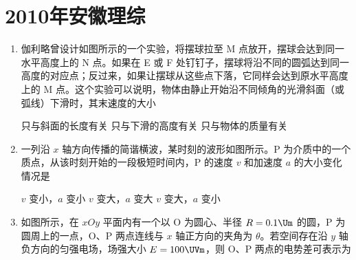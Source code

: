 \documentclass[\gkver]{gaokaozhenti}
\begin{document}
\chapter{2010年安徽理综}

\begin{enumerate}
\item
伽利略曾设计如图所示的一个实验，将摆球拉至 M 点放开，摆球会达到同一水平高度上的 N 点。如果在 E 或 F 处钉钉子，摆球将沿不同的圆弧达到同一高度的对应点；反过来，如果让摆球从这些点下落，它同样会达到原水平高度上的 M 点。这个实验可以说明，物体由静止开始沿不同倾角的光滑斜面（或弧线）下滑时，其末速度的大小


{只与斜面的长度有关}
{只与下滑的高度有关}
{只与物体的质量有关}


\item
一列沿 $x$ 轴方向传播的简谐横波，某时刻的波形如图所示。P 为介质中的一个质点，从该时刻开始的一段极短时间内，P 的速度 $v$ 和加速度 $a$ 的大小变化情况是


{$v$ 变小，$a$ 变小}
{$v$ 变大，$a$ 变大}
{$v$ 变大，$a$ 变小}


\item
如图所示，在 $xOy$ 平面内有一个以 O 为圆心、半径 $R=0.1\Um$ 的圆，P 为圆周上的一点，O、P 两点连线与 $x$ 轴正方向的夹角为 $\theta$。若空间存在沿 $y$ 轴负方向的匀强电场，场强大小 $E=100\UVm$，则 O、P 两点的电势差可表示为


\end{enumerate}
\end{document}
